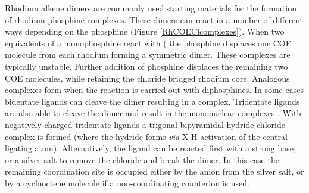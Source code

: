 Rhodium alkene dimers are commonly used starting materials for the formation of rhodium phosphine complexes.  These dimers can react in a number of different ways depending on the phosphine (Figure \ref{RhCOEClcomplexes}).  When two equivalents of a monophosphine react with  ( the phosphine displaces one \gls{COE} molecule from each rhodium forming a symmetric dimer.\cite{Canepa2003}  These complexes are typically unstable.  Further addition of phosphine displaces the remaining two COE molecules, while retaining the chloride bridged rhodium core.\cite{Bleeke1986}  Analogous complexes form when the reaction is carried out with diphosphines.\cite{Fryzuk1989}  In some cases bidentate ligands can cleave the dimer resulting in a \ce{[Rh(LL)(COE)Cl]} complex.\cite{Hashimoto2010}  Tridentate ligands are also able to cleave the dimer and result in the mononuclear complexes \ce{[Rh(LLL)Cl]}\cite{Khan1988, Hermann2002}.  With negatively charged tridentate ligands a trigonal bipyramidal hydride chloride complex is formed (where the hydride forms \emph{via} X-H activation of the central ligating atom).\cite{Boom1998, Winter2003, Salem2008}  Alternatively, the ligand can be reacted first with a strong base, or a silver salt to remove the chloride and break the dimer.  In this case the remaining coordination site is occupied either by the anion from the silver salt, or by a cyclooctene molecule if a non-coordinating counterion is used.\cite{Fryzuk1986, Hanson2008}

